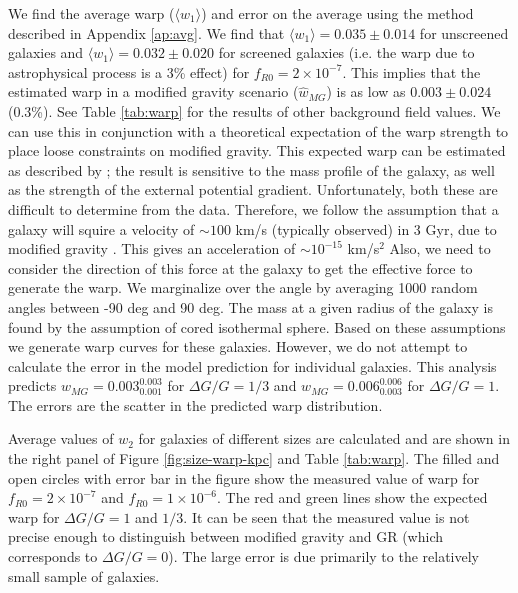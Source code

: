 \documentclass[useAMS,usenatbib,twocolumn]{mn2e}
\begin{document}
We find the average warp ($\langle w_1\rangle$) and error on the average 
using the method described in Appendix \ref{ap:avg}. We find that $\langle
w_1\rangle=0.035 \pm 0.014$ for unscreened galaxies and $\langle
w_1 \rangle=0.032 \pm 0.020$ for screened galaxies (i.e. the
warp due to astrophysical process is a 3\% effect) for $f_{R0} =
2\times10^{-7}$. This implies that the estimated warp in a modified gravity
scenario ($\hat{w}_{MG}$) is as low as $0.003 \pm 0.024$ (0.3\%). See Table
\ref{tab:warp} for
the results of other background field values. We can use this in conjunction
with a theoretical expectation of the warp strength to place loose
constraints on modified gravity. This expected warp can be estimated
as described by \citet{bhuvjake2011}; the result 
is sensitive to the mass profile of the galaxy,
as well as the strength of the external potential gradient. 
Unfortunately, both these are difficult to determine from the data.
Therefore, we follow the assumption that a galaxy will
squire a velocity of $\sim 100$ km/s (typically observed) in 3 Gyr, due to
modified gravity \citep{bhuvjake2011}.
This gives an acceleration of $\sim 10^{-15}$ km/s$^2$
Also, we need to consider
the direction of this force at the galaxy to get the effective force to
generate the warp. We marginalize over the angle by averaging
1000 random angles between -90 deg and 90 deg. The mass at a given
radius of the
galaxy is found by the assumption of cored isothermal sphere. Based on these
assumptions we generate warp curves for these galaxies. However, we do not
attempt to calculate the error in the model prediction for individual galaxies. 
This analysis predicts $w_{MG}= 0.003_{0.001}^{0.003}$ for
$\Delta G/G = 1/3$ and $w_{MG}=0.006_{0.003}^{0.006}$ for
$\Delta G/G = 1$. The errors are the scatter in the predicted warp distribution.

Average values of $w_2$ for galaxies of different sizes are calculated
and are shown in the right panel of Figure \ref{fig:size-warp-kpc} and Table
\ref{tab:warp}. The filled and open circles with error bar in the figure show
the measured value of warp for $f_{R0} = 2 \times10^{-7}$ and $f_{R0} = 1
\times10^{-6}$. The red and green lines show the expected warp for $\Delta G/G
= 1$ and $1/3$.
It can be seen that the measured value is not precise enough to distinguish
between modified gravity and GR (which corresponds to $\Delta G/G = 0$).
The large error is due primarily to the relatively small sample of galaxies.
\end{document}

